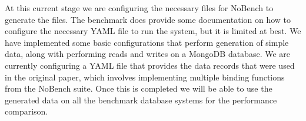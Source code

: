\documentclass[sigconf]{acmart}
\begin{document}
    At this current stage we are configuring the necessary files for NoBench to generate the files. The benchmark does provide some documentation on how to configure the necessary YAML file to run the system, but it is limited at best. We have implemented some basic configurations that perform generation of simple data, along with performing reads and writes on a MongoDB database. We are currently configuring a YAML file that provides the data records that were used in the original paper, which involves implementing multiple binding functions from the NoBench suite. Once this is completed we will be able to use the generated data on all the benchmark database systems for the performance comparison.



\end{document}
